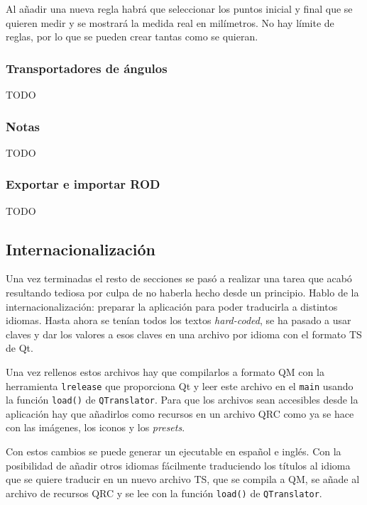 Al añadir una nueva regla habrá que seleccionar los puntos inicial y final que se quieren medir y se mostrará la medida real en milímetros. No hay límite de reglas, por lo que se pueden crear tantas como se quieran.

\subsubsection{Transportadores de ángulos}

TODO

\subsubsection{Notas}

TODO

\subsubsection{Exportar e importar ROD}

TODO

\subsection{Internacionalización}

Una vez terminadas el resto de secciones se pasó a realizar una tarea que acabó resultando tediosa por culpa de no haberla hecho desde un principio. Hablo de la internacionalización: preparar la aplicación para poder traducirla a distintos idiomas. Hasta ahora se tenían todos los textos \textit{hard-coded}, se ha pasado a usar claves y dar los valores a esos claves en una archivo por idioma con el formato TS de Qt.

Una vez rellenos estos archivos hay que compilarlos a formato QM con la herramienta \texttt{lrelease} que proporciona Qt y leer este archivo en el \texttt{main} usando la función \texttt{load()} de \texttt{QTranslator}. Para que los archivos sean accesibles desde la aplicación hay que añadirlos como recursos en un archivo QRC como ya se hace con las imágenes, los iconos y los \textit{presets}.

Con estos cambios se puede generar un ejecutable en español e inglés. Con la posibilidad de añadir otros idiomas fácilmente traduciendo los títulos al idioma que se quiere traducir en un nuevo archivo TS, que se compila a QM, se añade al archivo de recursos QRC y se lee con la función \texttt{load()} de \texttt{QTranslator}.